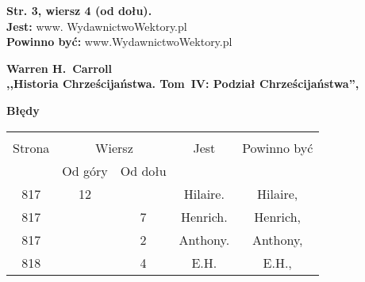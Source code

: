 \documentclass[a4paper,11pt]{article}  %
\newcommand{\spaceTwo}{2em}
\newcommand{\tb}{\textbf}
\newcommand{\noi}{\noindent}
\newcommand{\StrWd}[2]{\tb{Str. #1, wiersz #2 (od dołu).}}
\newcommand{\Jest}{\tb{Jest: }}
\newcommand{\Pow}{\tb{Powinno być: }}
\newcommand{\Center}[1]{\begin{center} #1 \end{center}}
\newcommand{\CenterTB}[1]{\Center{\tb{#1}}}
\newcommand{\Work}[1]{ \begin{center} {\large \tb{#1}} \end{center} }
\begin{document}
\noi
\StrWd{3}{4} \\
\Jest www. WydawnictwoWektory.pl \\
\Pow  www.WydawnictwoWektory.pl \\

\vspace{\spaceTwo}





\Work{
  Warren H.~Carroll \\
  ,,Historia Chrześcijaństwa. Tom~IV: Podział Chrześcijaństwa'',
  \cite{CarrollHistoriaChrzecijanstwaTomIV11} }


\CenterTB{Błędy}
\begin{center}
  \begin{tabular}{|c|c|c|c|c|}
    \hline
    & \multicolumn{2}{c|}{} & & \\
    Strona & \multicolumn{2}{c|}{Wiersz}& Jest & Powinno być \\ \cline{2-3}
    & Od góry & Od dołu &  &  \\ \hline
    817 & 12 & & Hilaire. & Hilaire, \\
    817 & &  7 & Henrich. & Henrich, \\
    817 & &  2 & Anthony. & Anthony, \\
    818 & &  4 & E.H. & E.H., \\

\end{tabular}
\end{center}
\end{document}
